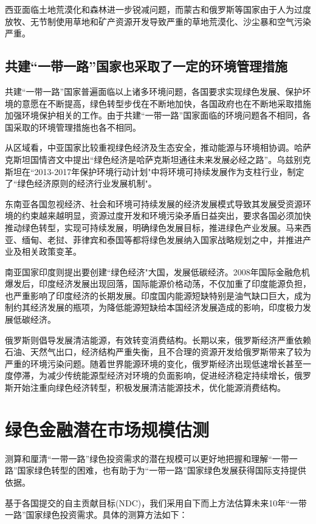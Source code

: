 西亚面临土地荒漠化和森林进一步锐减问题，而蒙古和俄罗斯等国家由于人为过度放牧、无节制使用草地和矿产资源开发导致严重的草地荒漠化、沙尘暴和空气污染严重。

\subsection*{共建“一带一路”国家也采取了一定的环境管理措施}

共建“一带一路”国家普遍面临以上诸多环境问题，各国要求实现绿色发展、保护坏境的意愿在不断提高，绿色转型步伐在不断地加快，各国政府也在不断地采取措施加强环境保护相关的工作。由于共建“一带一路”国家面临的环境问题各不相同，各国采取的环境管理措施也各不相同。

从区域看，中亚国家比较重视绿色经济及生态安全，推动能源与环境相协调。哈萨克斯坦国情咨文中提出“绿色经济是哈萨克斯坦通往未来发展必经之路”。乌兹别克斯坦在“2013-2017年保护环境行动计划"中将环境可持续发展作为支柱行业，制定了“绿色经济原则的经济行业发展机制"。

东南亚各国忽视经济、社会和环境可持续发展的经济发展模式导致其发展受资源环境的约束越来越明显，资源过度开发和环境污染矛盾日益突出，要求各国必须加快推动绿色转型，实现可持续发展，明确绿色发展目标，推进绿色产业发展。马来西亚、缅甸、老挝、菲律宾和泰国等都将绿色发展纳入国家战略规划之中，并推进产业及相关政策变革。

南亚国家印度则提出要创建“绿色经济"大国，发展低碳经济。2008年国际金融危机爆发后，印度经济发展出现回落，国际能源价格动荡，不仅加重了印度能源负担，也严重影响了印度经济的长期发展。印度国内能源短缺特别是油气缺口巨大，成为制约其经济发展的瓶项，为降低能源短缺给本国经济发展造成的影响，印度极力发展低碳经济。

俄罗斯则倡导发展清洁能源，有效转变消费结构。长期以来，俄罗斯经济严重依赖石油、天然气出口，经济结构严重失衡，且不合理的资源开发给俄罗斯带来了较为严重的环境污染问题。随着世界能源环境的变化，俄罗斯经济出现低速增长甚至一度停滞，为减少传统能源型经济对环境的负面影响，促进经济稳定持续增长，俄罗斯开始注重向绿色经济转型，积极发展清洁能源技术，优化能源消费结构。
\section*{绿色金融潜在市场规模估测}
测算和厘清“一带一路”绿色投资需求的潜在规模可以更好地把握和理解“一带一路”国家绿色转型的困难，也有助于为“一带一路”国家绿色发展获得国际支持提供依据。

基于各国提交的自主贡献目标(NDC)，我们采用自下而上方法估算未来10年“一带一路”国家绿色投资需求。具体的测算方法如下：

